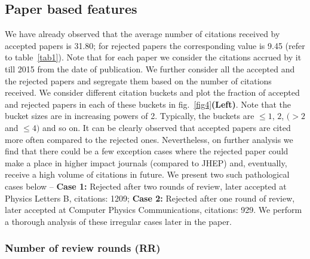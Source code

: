 \subsection{Paper based features}
\label{analysis}
We have already observed that the average number of citations received by accepted papers is 31.80; for rejected papers the corresponding value is 9.45 (refer to table~\ref{tab1}). Note that for each paper we consider the citations accrued by it till 2015 from the date of publication.
We further consider all the accepted and the rejected papers and segregate them based on the number of citations received. We consider different citation buckets and plot the fraction of accepted and rejected papers in each of these buckets in fig.~\ref{fig4}{\bf (Left)}. Note that the bucket sizes are in increasing powers of 2. Typically, the buckets are $\leq 1$, $2$, $(>2$ and $\leq 4)$ and so on. It can be clearly observed that accepted papers are cited more often compared to the rejected ones. Nevertheless, on further analysis we find that there could be a few exception cases where the rejected paper could make a place in higher impact journals (compared to JHEP) and, eventually, receive a high volume of citations in future. We present two such pathological cases below -- {\bf Case 1:} Rejected after two rounds of review, later accepted at Physics Letters B, citations: 1209; {\bf Case 2:} Rejected after one round of review, later accepted at Computer Physics Communications, citations: 929. We perform a thorough analysis of these irregular cases later in the paper.



\subsubsection{Number of review rounds (RR)}

